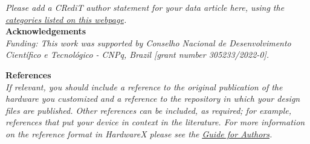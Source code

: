 \documentclass[11pt, letterpaper]{article}
\begin{document}
\noindent
{\it Please add a CRediT author statement for your data article here, using the \href{https://www.elsevier.com/authors/journal-authors/policies-and-ethics/credit-author-statement}{categories listed on this webpage}.}\\


\noindent
\textbf{Acknowledgements}\\
\noindent
\textit{Funding: This work was supported by Conselho Nacional de Desenvolvimento Científico e Tecnológico - CNPq, Brazil [grant number 305233/2022-0].}
\vskip 0.2cm

\noindent
\textbf{References}\\
\noindent 
\textit{If relevant, you should include a reference to the original publication of the hardware you customized and a reference to the repository in which your design files are published.  Other references can be included, as required; for example, references that put your device in context in the literature. For more information on the reference format in HardwareX please see the \href{https://www.elsevier.com/journals/hardwarex/2468-0672/guide-for-authors}{\underline{Guide for Authors}}.}
\end{document}
